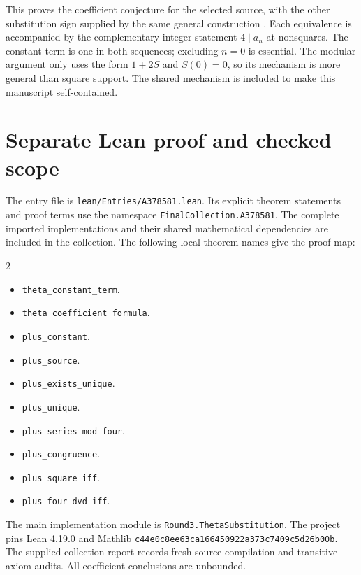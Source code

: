 \documentclass[11pt,a4paper]{article}
\theoremstyle{remark}
\begin{document}
This proves the coefficient conjecture for the selected source, with the
other substitution sign supplied by the same general construction
\cite{oeis580,oeis581}. Each equivalence is accompanied
by the complementary integer statement $4\mid a_n$ at nonsquares.
The constant term is one in both sequences; excluding $n=0$ is essential.
The modular argument only uses the form $1+2S$ and $S(0)=0$, so its
mechanism is more general than square support. The shared mechanism is included to make this manuscript self-contained.


\section{Separate Lean proof and checked scope}

The entry file is \nolinkurl{lean/Entries/A378581.lean}. Its explicit
theorem statements and proof terms use the namespace
\nolinkurl{FinalCollection.A378581}. The complete imported implementations
and their shared mathematical dependencies are included in the collection.
The following local theorem names give the proof map:

\begin{multicols}{2}\raggedright\begin{itemize}\setlength{\itemsep}{2pt}\setlength{\parsep}{0pt}
\item \nolinkurl{theta_constant_term}.
\item \nolinkurl{theta_coefficient_formula}.
\item \nolinkurl{plus_constant}.
\item \nolinkurl{plus_source}.
\item \nolinkurl{plus_exists_unique}.
\item \nolinkurl{plus_unique}.
\item \nolinkurl{plus_series_mod_four}.
\item \nolinkurl{plus_congruence}.
\item \nolinkurl{plus_square_iff}.
\item \nolinkurl{plus_four_dvd_iff}.
\end{itemize}\end{multicols}

The main implementation module is \nolinkurl{Round3.ThetaSubstitution}.
The project pins Lean 4.19.0 and Mathlib
\nolinkurl{c44e0c8ee63ca166450922a373c7409c5d26b00b}.
The supplied collection report records fresh source compilation and
transitive axiom audits. All coefficient conclusions are unbounded.
\end{document}
